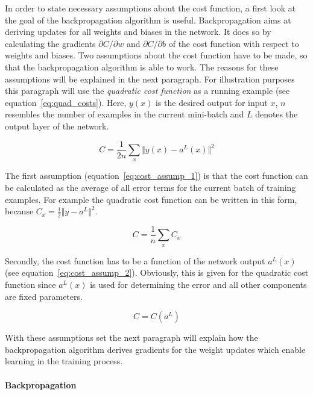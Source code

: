 In order to state necessary assumptions about the cost function, a first look
at the goal of the backpropagation algorithm is useful.
Backpropagation aims at deriving updates for all weights and biases in
the network.
It does so by calculating the gradients $\partial C / \partial w$ and 
$\partial C / \partial b$ of the cost function with respect to weights and
biases.
Two assumptions about the cost function have to be made, so that the 
backpropagation algorithm is able to work. 
The reasons for these assumptions will be explained in the next paragraph.
For illustration purposes this paragraph will use the \textit{quadratic cost function}
as a running example (see equation~\ref{eq:quad_costs}).
Here, $y(x)$ is the desired output for input $x$, $n$ resembles the number of
examples in the current mini-batch and $L$ denotes the output layer of the
network.

\begin{equation}
  \label{eq:quad_costs}
  C = \frac{1}{2n} \sum_x \Vert y(x) - a^L(x) \Vert^2
\end{equation}

The first assumption (equation~\ref{eq:cost_assump_1}) is that the cost function 
can be calculated as the average of all error terms for the current batch
of training examples. For example the quadratic cost function can be written in
this form, because $C_x = \frac{1}{2} \Vert y - a^L \Vert^2$.

\begin{equation}
  \label{eq:cost_assump_1}
  C = \frac{1}{n} \sum_x C_x
\end{equation}

Secondly, the cost function has to be a function of the network output $a^L(x)$
(see equation~\ref{eq:cost_assump_2}).
Obviously, this is given for the quadratic cost function since $a^L(x)$ is used
for determining the error and all other components are fixed parameters.

\begin{equation}
  \label{eq:cost_assump_2}
  C = C(a^L)
\end{equation}

With these assumptions set the next paragraph will explain how the
backpropagation algorithm derives gradients for the weight updates which enable
learning in the training process.

\paragraph{Backpropagation}
\label{sub:backprop}

